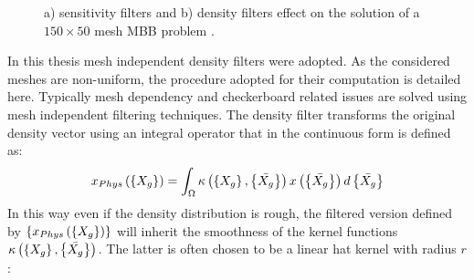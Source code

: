 \begin{figure}[hbt!]
  \centering
       \caption{a) sensitivity filters and b) density filters effect on the solution of a $150\times 50$ mesh MBB problem \cite{andreassen2011efficient}. }
       \label{fig2.14b}
     \end{figure}
In this thesis mesh independent density filters \cite{bourdin2001filters,bruns2001topology} were adopted.  As the considered meshes are non-uniform, the procedure adopted for their computation is detailed here.
 Typically mesh dependency and checkerboard related issues are solved using mesh independent filtering techniques.
 The density filter transforms the original density vector using an integral operator that in the continuous form is defined as:
 \begin{equation}
 \label{eq2.16}
x_{Phys}\left(\left\lbrace{X_g}\right \rbrace\right)=\int_{\Omega}{\kappa\left(\left\lbrace{X_g}\right \rbrace,\left\lbrace{\bar{X_g}}\right \rbrace\right)x\left(\left\lbrace{\bar{X_g}}\right \rbrace\right)d\left\lbrace{\bar{X_g}}\right \rbrace} 
 \end{equation} 
 In this way even if the density distribution is rough, the filtered version defined by $ \left\lbrace{x_{Phys}\left(\ensuremath\left\lbrace{X_g}\right \rbrace\right)}\right \rbrace$ will inherit the smoothness of the kernel functions $\kappa\left(\left\lbrace{X_g}\right \rbrace,\left\lbrace{\bar{X_g}}\right \rbrace\right)$.
 The latter is often chosen to be a linear hat kernel with radius $r$:
